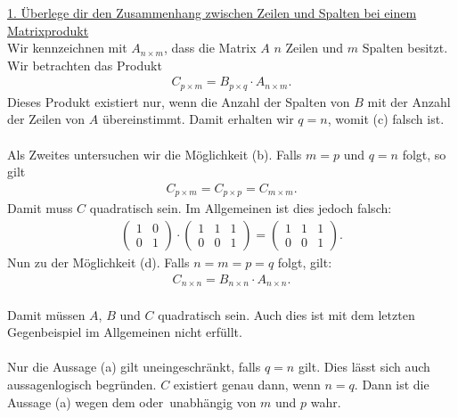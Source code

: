 \underline{1. Überlege dir den Zusammenhang zwischen Zeilen und Spalten bei einem Matrixprodukt}\\
Wir kennzeichnen mit $ A_{n \times m} $, dass die Matrix $ A $ $ n $ Zeilen und $ m $ Spalten besitzt.
Wir betrachten das Produkt
\begin{align*}
C_{p \times m }  = B_{p \times q} \cdot A_{n \times m}.
\end{align*}
Dieses Produkt existiert nur, wenn die Anzahl der Spalten von $ B $ mit der Anzahl der Zeilen von $ A $ übereinstimmt.
Damit erhalten wir $ q = n $, womit (c) falsch ist. \\
\\
Als Zweites untersuchen wir die Möglichkeit (b). Falls
$  m =p $ und $ q = n $ folgt, so gilt
\begin{align*}
C_{p \times m} = C_{p \times p} = C_{m \times m}.
\end{align*}
Damit muss $ C $ quadratisch sein.
Im Allgemeinen ist dies jedoch falsch:
\begin{align*}
\begin{pmatrix}
1 & 0 \\
0 & 1
\end{pmatrix} 
\cdot
\begin{pmatrix}
1 & 1 & 1 \\
0 & 0 & 1
\end{pmatrix}
=
\begin{pmatrix}
1 & 1 & 1 \\
0 & 0 & 1
\end{pmatrix}.
\end{align*}
Nun zu der Möglichkeit (d). Falls $ n = m = p = q $ folgt, gilt:
\begin{align*}
C_{n \times n }  = B_{n \times n} \cdot A_{n \times n}.
\end{align*}
\ \\
Damit müssen $ A $, $ B $ und $ C $ quadratisch sein. Auch dies ist mit dem letzten Gegenbeispiel im Allgemeinen nicht erfüllt.\\
\\



%
Nur die Aussage (a) gilt uneingeschränkt, falls $ q = n $ gilt.
Dies lässt sich auch aussagenlogisch begründen.
$ C $ existiert genau dann, wenn $ n = q $.
Dann ist die Aussage (a) wegen dem \glqq oder\grqq \ unabhängig von $ m $ und $ p $ wahr.
\newpage

